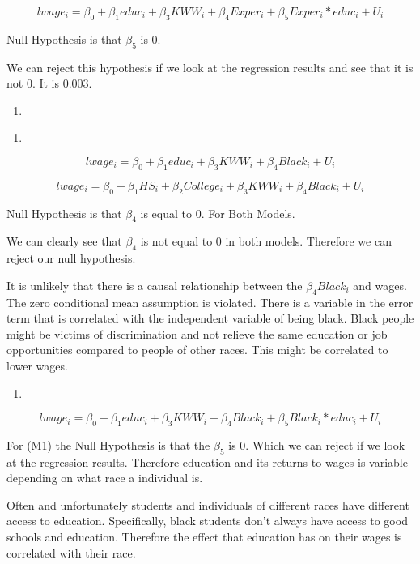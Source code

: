 \documentclass[
  12pt,
  landscape]{article}
\begin{document}
\[
lwage_i = \beta_0 + \beta_1educ_i + \beta_3KWW_i + \beta_4Exper_i + \beta_5Exper_i*educ_i + U_i
\]

Null Hypothesis is that \({\beta_5}\) is 0.

We can reject this hypothesis if we look at the regression results and
see that it is not 0. It is 0.003.

\begin{enumerate}
\def\labelenumi{(\roman{enumi})}
\item
\end{enumerate}

\begin{enumerate}
\def\labelenumi{(\alph{enumi})}
\setcounter{enumi}{9}
\item
\end{enumerate}

\[
lwage_i = \beta_0 + \beta_1educ_i + \beta_3KWW_i + \beta_4Black_i + U_i
\]

\[
lwage_i = \beta_0 + \beta_1HS_i + \beta_2College_i + \beta_3KWW_i + \beta_4Black_i + U_i
\]

Null Hypothesis is that \({\beta_4}\) is equal to 0. For Both Models.

We can clearly see that \({\beta_4}\) is not equal to 0 in both models.
Therefore we can reject our null hypothesis.

It is unlikely that there is a causal relationship between the
\({\beta_4Black_i}\) and wages. The zero conditional mean assumption is
violated. There is a variable in the error term that is correlated with
the independent variable of being black. Black people might be victims
of discrimination and not relieve the same education or job
opportunities compared to people of other races. This might be
correlated to lower wages.

\begin{enumerate}
\def\labelenumi{(\alph{enumi})}
\setcounter{enumi}{10}
\item
\end{enumerate}

\[
lwage_i = \beta_0 + \beta_1educ_i + \beta_3KWW_i + \beta_4Black_i + \beta_5Black_i*educ_i + U_i
\]

For (M1) the Null Hypothesis is that the \({\beta_5}\) is 0. Which we
can reject if we look at the regression results. Therefore education and
its returns to wages is variable depending on what race a individual is.

Often and unfortunately students and individuals of different races have
different access to education. Specifically, black students don't always
have access to good schools and education. Therefore the effect that
education has on their wages is correlated with their race.
\end{document}

